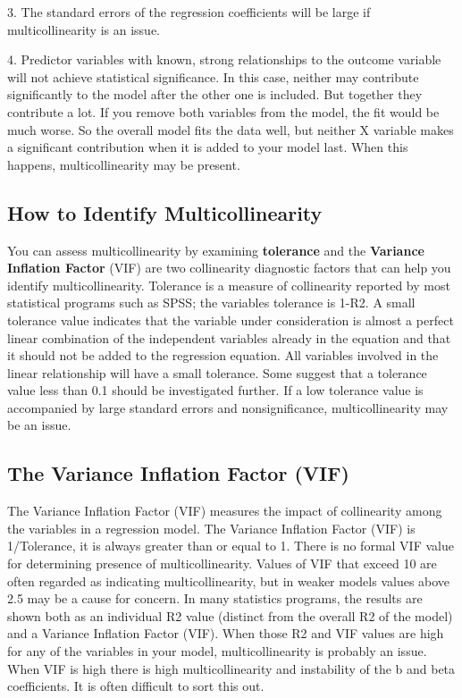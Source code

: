\documentclass[12pt]{article}
\begin{document}
3. The standard errors of the regression coefficients will be large if multicollinearity is an issue.

4. Predictor variables with known, strong relationships to the outcome variable will not achieve statistical significance. In this case, neither may contribute significantly to the model after the other one is included. But together they contribute a lot. If you remove both variables from the model, the fit would be much worse. So the overall model fits the data well, but neither X variable makes a significant contribution when it is added to your model last. When this happens, multicollinearity may be present.

\subsection{How to Identify Multicollinearity}


You can assess multicollinearity by examining \textbf{tolerance} and the \textbf{Variance Inflation Factor} (VIF) are two collinearity diagnostic factors that can help you identify multicollinearity. Tolerance is a measure of collinearity reported by most statistical programs such as SPSS; the variables tolerance is 1-R2. A small tolerance value indicates that the variable under consideration is almost a perfect linear combination of the independent variables already in the equation and that it should not be added to the regression equation. All variables involved in the linear relationship will have a small tolerance. Some suggest that a tolerance value less than 0.1 should be investigated further. If a low tolerance value is accompanied by large standard errors and nonsignificance, multicollinearity may be an issue.


\subsection{The Variance Inflation Factor (VIF)}



The Variance Inflation Factor (VIF) measures the impact of collinearity among the variables in a regression model. The Variance Inflation Factor (VIF) is 1/Tolerance, it is always greater than or equal to 1. There is no formal VIF value for determining presence of multicollinearity. Values of VIF that exceed 10 are often regarded as indicating multicollinearity, but in weaker models values above 2.5 may be a cause for concern. In many statistics programs, the results are shown both as an individual R2 value (distinct from the overall R2 of the model) and a Variance Inflation Factor (VIF). When those R2 and VIF values are high for any of the variables in your model, multicollinearity is probably an issue. When VIF is high there is high multicollinearity and instability of the b and beta coefficients. It is often difficult to sort this out. \\
\end{document}
